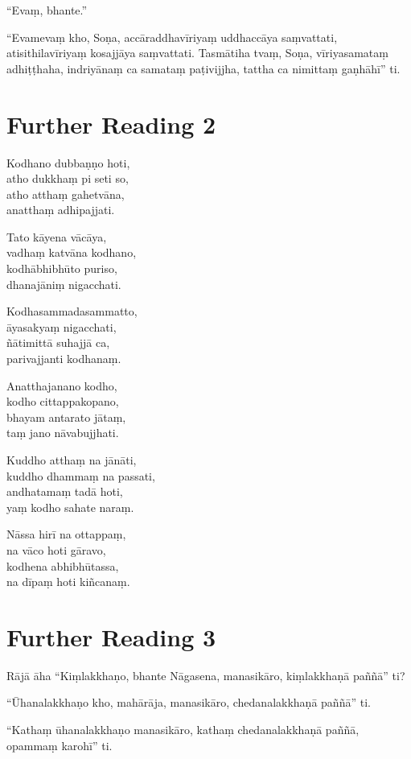 “Evaṃ, bhante.”

“Evamevaṃ kho, Soṇa, accāraddhavīriyaṃ uddhaccāya saṃvattati, atisithilavīriyaṃ kosajjāya saṃvattati. Tasmātiha tvaṃ, Soṇa, vīriyasamataṃ adhiṭṭhaha, indriyānaṃ ca samataṃ paṭivijjha, tattha ca nimittaṃ gaṇhāhī” ti.

\section*{Further Reading 2}

Kodhano dubbaṇṇo hoti,\\
atho dukkhaṃ pi seti so,\\
atho atthaṃ gahetvāna,\\
anatthaṃ adhipajjati.

Tato kāyena vācāya,\\
vadhaṃ katvāna kodhano,\\
kodhābhibhūto puriso,\\
dhanajāniṃ nigacchati.

Kodhasammadasammatto,\\
āyasakyaṃ nigacchati,\\
ñātimittā suhajjā ca,\\
parivajjanti kodhanaṃ.

Anatthajanano kodho,\\
kodho cittappakopano,\\
bhayam antarato jātaṃ,\\
taṃ jano nāvabujjhati.

Kuddho atthaṃ na jānāti,\\
kuddho dhammaṃ na passati,\\
andhatamaṃ tadā hoti,\\
yaṃ kodho sahate naraṃ.

Nāssa hirī na ottappaṃ,\\
na vāco hoti gāravo,\\
kodhena abhibhūtassa,\\
na dīpaṃ hoti kiñcanaṃ.

\section*{Further Reading 3}

Rājā āha “Kiṃlakkhaṇo, bhante Nāgasena, manasikāro, kiṃlakkhaṇā paññā” ti?

“Ūhanalakkhaṇo kho, mahārāja, manasikāro, chedanalakkhaṇā paññā” ti.

“Kathaṃ ūhanalakkhaṇo manasikāro, kathaṃ chedanalakkhaṇā paññā, opammaṃ karohī” ti.

